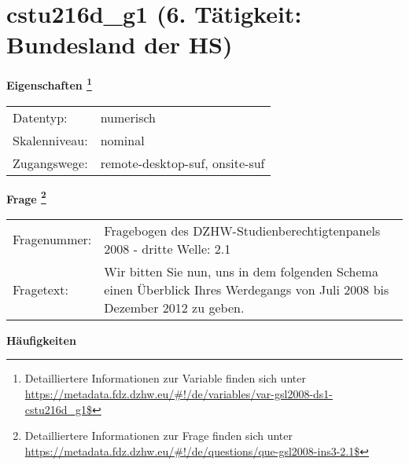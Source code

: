 
    \setcounter{footnote}{0}

    \vspace*{-1.8cm}
	\section{cstu216d\_g1 (6. Tätigkeit: Bundesland der HS)}
	\label{section:cstu216d_g1}



    \vspace*{0.5cm}
    \noindent\textbf{Eigenschaften
	\footnote{Detailliertere Informationen zur Variable finden sich unter
		\url{https://metadata.fdz.dzhw.eu/\#!/de/variables/var-gsl2008-ds1-cstu216d_g1$}}}\\
	\begin{tabularx}{\hsize}{@{}lX}
	Datentyp: & numerisch \\
	Skalenniveau: & nominal \\
	Zugangswege: &
	  remote-desktop-suf, 
	  onsite-suf
 \\
    \end{tabularx}



				\vspace*{0.5cm}
                \noindent\textbf{Frage
	                \footnote{Detailliertere Informationen zur Frage finden sich unter
		              \url{https://metadata.fdz.dzhw.eu/\#!/de/questions/que-gsl2008-ins3-2.1$}}}\\
				\begin{tabularx}{\hsize}{@{}lX}
					Fragenummer: &
					  Fragebogen des DZHW-Studienberechtigtenpanels 2008 - dritte Welle:
					  2.1
 \\
					Fragetext: & Wir bitten Sie nun, uns in dem folgenden Schema einen Überblick Ihres Werdegangs von Juli 2008 bis Dezember 2012 zu geben. \\
				\end{tabularx}





        		\vspace*{0.5cm}
                \noindent\textbf{Häufigkeiten}

